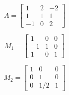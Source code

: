 \[
A=\left[
\begin{array}{ccc}
1 & 2 & -2 \\
1 & 1 & 1\\
-1 & 0 & 2
\end{array}\right]
\]
\bigskip

\[
M_1=\left[
\begin{array}{ccc}
  1 & 0 & 0 \\
  -1 & 1 & 0 \\
  1 & 0 & 1
\end{array}
\right]
\]

\bigskip

\[
M_2=\left[
\begin{array}{ccc}
  1 & 0 & 0 \\
  0 & 1 & 0 \\
  0 & 1/2 & 1
\end{array}
\right]
\]
